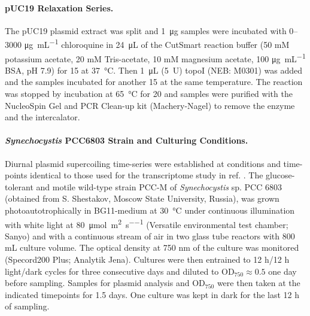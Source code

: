 \documentclass[10pt,a4]{article}
\def\cite#1{\hypersetup{citecolor=Teal}\citep{#1}} %
\newcommand{\photons}{\micro\mol\per\square\meter\per\second}
\newcommand{\ugml}{\micro\gram\per\milli\liter}
\newcommand{\scyst}{\textit{Synechocystis} PCC6803}
\newcommand{\OD}{\ensuremath{\text{OD}_{750}}}
\begin{document}
\paragraph{pUC19 Relaxation Series.}
The pUC19 plasmid extract was split and \SI{1}{\ug} samples were
incubated with 0--3000 \si{\ugml} chloroquine in \SI{24}{\uL} of the
CutSmart reaction buffer (50 mM potassium acetate, 20 mM Tris-acetate,
10 mM magnesium acetate, 100 \si{\ugml} BSA, pH 7.9) for \SI{15}{\min}
at \SI{37}{\celsius}. Then \SI{1}{\uL} (\SI{5}{U}) topoI (NEB: M0301)
was added and the samples incubated for another \SI{15}{\min} at the
same temperature. The reaction was stopped by incubation at
\SI{65}{\celsius} for \SI{20}{\min} and samples were purified with the
NucleoSpin Gel and PCR Clean-up kit (Machery-Nagel) to remove the
enzyme and the intercalator.

\paragraph{\scyst{} Strain and Culturing Conditions.}
Diurnal plasmid supercoiling time-series were established at
conditions and time-points identical to those used for the
transcriptome study in ref. \cite{Lehmann2013, Beck2014}.  The
glucose-tolerant and motile wild-type strain PCC-M of
\textit{Synechocystis} sp. PCC 6803 (obtained from S.  Shestakov,
Moscow State University, Russia), was grown photoautotrophically in
BG11-medium at \SI{30}{\celsius} under continuous illumination with
white light at \SI{80}{\photons} (Versatile environmental test
chamber; Sanyo) and with a continuous stream of air in two 
glass tube reactors with 800 mL culture volume.  The optical
density at 750 nm of the culture was monitored (Specord200 Plus;
Analytik Jena). Cultures were then entrained to 12 h/12 h light/dark
cycles for three consecutive days and diluted to $\OD{}\approx 0.5$
one day before sampling. Samples for plasmid analysis and \OD{} were
then taken at the indicated timepoints for 1.5 days. One culture was
kept in dark for the last 12 h of sampling.
\end{document}
